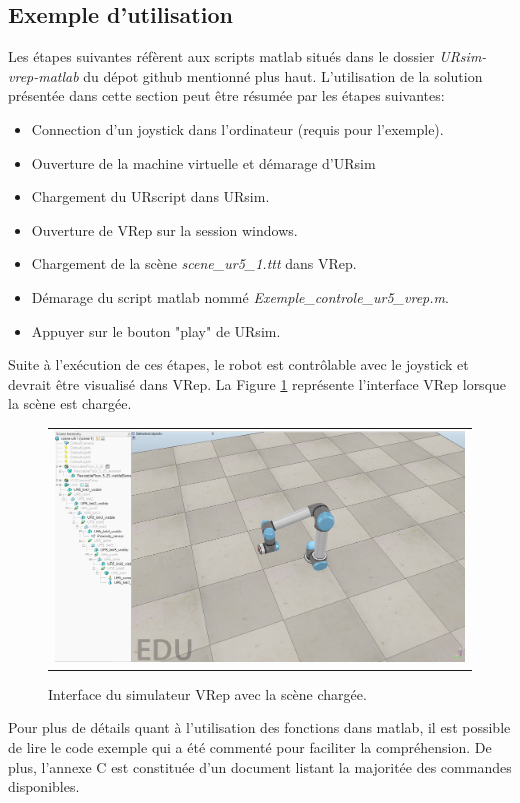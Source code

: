 \documentclass[root.tex]{subfiles}
\begin{document}
\subsection{Exemple d'utilisation}

Les étapes suivantes réfèrent aux scripts matlab situés dans le dossier \textit{URsim-vrep-matlab} du dépot github mentionné plus haut.
L'utilisation de la solution présentée dans cette section peut être résumée par les étapes suivantes:

\begin{itemize}
\item Connection d'un joystick dans l'ordinateur (requis pour l'exemple).
\item Ouverture de la machine virtuelle et démarage d'URsim
\item Chargement du URscript dans URsim.
\item Ouverture de VRep sur la session windows.
\item Chargement de la scène \textit{scene\_ur5\_1.ttt} dans VRep.
\item Démarage du script matlab nommé \textit{Exemple\_controle\_ur5\_vrep.m}.
\item Appuyer sur le bouton "play" de URsim.
\end{itemize}

Suite à l'exécution de ces étapes, le robot est contrôlable avec le joystick et devrait être visualisé dans VRep. La Figure \ref{fig:vrep_scene} représente l'interface VRep lorsque la scène est chargée.
\begin{figure}
 \begin{center}
  \begin{tabular}{c}
    \includegraphics[trim=0cm 0cm 0cm 0cm, scale=0.25]{vrep_ur.png}
  \end{tabular}
 \end{center}
\caption{Interface du simulateur VRep avec la scène chargée.}
 \label{fig:vrep_scene}
\end{figure}
Pour plus de détails quant à l'utilisation des fonctions dans matlab, il est possible de lire le code exemple qui a été commenté pour faciliter la compréhension. De plus, l'annexe C est constituée d'un document listant la majoritée des commandes disponibles.
\end{document}
